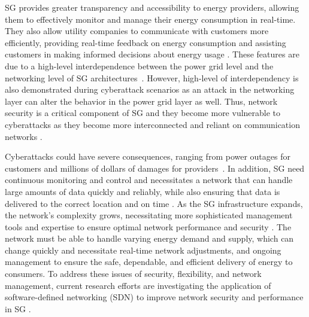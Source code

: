 \documentclass[conference]{IEEEtran}
\begin{document}
SG provides greater transparency and accessibility to energy providers, allowing them to effectively monitor and manage their energy consumption in real-time\cite{butt2021recent}. They also allow utility companies to communicate with customers more efficiently, providing real-time feedback on energy consumption and assisting customers in making informed decisions about energy usage \cite{sirojan2019embedded}. These features are due to a high-level interdependence between the power grid level and the networking level of SG architectures~\cite{agnew2022implementation, kong2020routing, aljohani2022cross}. However, high-level of interdependency is also demonstrated during cyberattack scenarios as an attack in the networking layer can alter the behavior in the power grid layer as well\cite{agnew2022implementation}. Thus, network security is a critical component of SG and they become more vulnerable to cyberattacks as they become more interconnected and reliant on communication networks \cite{priyadarshini2021identifying, kong2020review}.

Cyberattacks could have severe consequences, ranging from power outages for customers and millions of dollars of damages for providers~\cite{singh2018entropy}. In addition, SG need continuous monitoring and control and necessitates a network that can handle large amounts of data quickly and reliably, while also ensuring that data is delivered to the correct location and on time \cite{kumari2019fog}. As the SG infrastructure expands, the network's complexity grows, necessitating more sophisticated management tools and expertise to ensure optimal network performance and security \cite{fan2021restoration}. The network must be able to handle varying energy demand and supply, which can change quickly and necessitate real-time network adjustments, and ongoing management to ensure the safe, dependable, and efficient delivery of energy to consumers. To address these issues of security, flexibility, and network management, current research efforts  are investigating the application of software-defined networking (SDN) to improve network security and performance in SG \cite{rehmani2019software, aggarwal2021survey}. 
\end{document}
